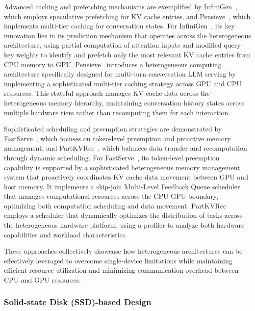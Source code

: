 Advanced caching and prefetching mechanisms are exemplified by InfiniGen~\cite{lee2024infinigenefficientgenerativeinference}, which employs speculative prefetching for KV cache entries, and Pensieve~\cite{DBLP:journals/corr/abs-2312-05516}, which implements multi-tier caching for conversation states. 
For InfiniGen~\cite{lee2024infinigenefficientgenerativeinference}, its key innovation lies in its prediction mechanism that operates across the heterogeneous architecture, using partial computation of attention inputs and modified query-key weights to identify and prefetch only the most relevant KV cache entries from CPU memory to GPU. 
Pensieve~\cite{DBLP:journals/corr/abs-2312-05516} introduces a heterogeneous computing architecture specifically designed for multi-turn conversation LLM serving by implementing a sophisticated multi-tier caching strategy across GPU and CPU resources. This stateful approach manages KV cache data across the heterogeneous memory hierarchy, maintaining conversation history states across multiple hardware tiers rather than recomputing them for each interaction. 

Sophisticated scheduling and preemption strategies are demonstrated by FastServe~\cite{wu2024fastdistributedinferenceserving}, which focuses on token-level preemption and proactive memory management, and PartKVRec~\cite{jiang2024efficientllminferenceioaware}, which balances data transfer and recomputation through dynamic scheduling. 
For FastServe~\cite{wu2024fastdistributedinferenceserving}, its token-level preemption capability is supported by a sophisticated heterogeneous memory management system that proactively coordinates KV cache data movement between GPU and host memory. It implements a skip-join Multi-Level Feedback Queue scheduler that manages computational resources across the CPU-GPU boundary, optimizing both computation scheduling and data movement. 
PartKVRec~\cite{jiang2024efficientllminferenceioaware} employs a scheduler that dynamically optimizes the distribution of tasks across the heterogeneous hardware platform, using a profiler to analyze both hardware capabilities and workload characteristics. 

These approaches collectively showcase how heterogeneous architectures can be effectively leveraged to overcome single-device limitations while maintaining efficient resource utilization and minimizing communication overhead between CPU and GPU resources.

\subsubsection{Solid-state Disk (SSD)-based Design}\label{sec:sys_hd_ssd}

